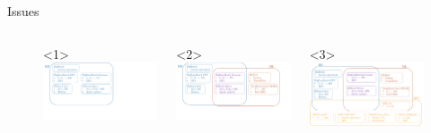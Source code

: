 \documentclass[aspectratio=169]{beamer}
\begin{document}
\begin{frame}[c]{Issues}
    \begin{figure}
        \begin{columns}[onlytextwidth]
            \begin{onlyenv}<1>%
            \includegraphics[width=1\textwidth]{images/Benchmarks_BD.png}%
            \end{onlyenv}
            \begin{onlyenv}<2>%
            \includegraphics[width=1\textwidth]{images/Benchmarks_BDML.png}%
            \end{onlyenv}
            \begin{onlyenv}<3>%
            \includegraphics[width=1\textwidth]{images/Benchmarks_ALL.png}%

\end{onlyenv}
\end{columns}
\end{figure}
\end{frame}
\end{document}
